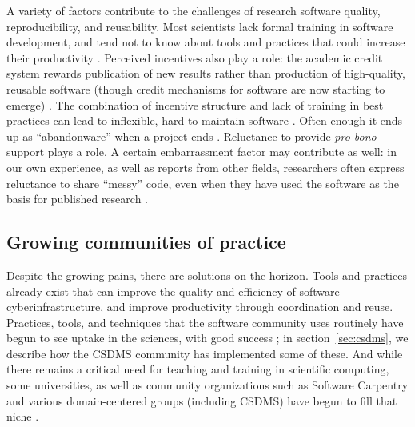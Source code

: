 \documentclass[12pt]{amsart}
\begin{document}
A variety of factors contribute to the challenges of research software quality, reproducibility, and reusability. Most scientists lack formal training in software development, and tend not to know about tools and practices that could increase their productivity \citep{kelly2007software,basili2008understanding,faulk2009scientific,hannay2009scientists,hwang2017software,alnoamany2018towards,pinto2018scientists,kellogg2018role}. Perceived incentives also play a role: the academic credit system rewards publication of new results rather than production of high-quality, reusable software (though credit mechanisms for software are now starting to emerge) \citep{leveque2009python,howison2011scientific,morin2012shining,turk2013scaling,ahalt2014water,poisot2015best,hwang2017software,wiese2019naming}. The combination of incentive structure and lack of training in best practices can lead to inflexible, hard-to-maintain software \citep{brown2014run,johanson2018software}. Often enough it ends up as ``abandonware'' when a project ends \citep{barnes2010publish}. Reluctance to provide \textit{pro bono} support plays a role. A certain embarrassment factor may contribute as well: in our own experience, as well as reports from other fields, researchers often express reluctance to share ``messy'' code, even when they have used the software as the basis for published research \citep{barnes2010publish,morin2012shining,leveque2013top}.



\subsection{Growing communities of practice}

Despite the growing pains, there are solutions on the horizon. Tools and practices already exist that can improve the quality and efficiency of software cyberinfrastructure, and improve productivity through coordination and reuse. Practices, tools, and techniques that the software community uses routinely have begun to see uptake in the sciences, with good success \citep{bangerth2013makes,turk2013scaling,hastings2014ten,wilson2014best,brown2014run,poisot2015best,hwang2017software,nanthaamornphong2017test,scott2017esip,taschuk2017ten,wilson2017good,benureau2018re,bryan2018excuse,adorf2018professionally,lathrop2019introduction}; in section~\ref{sec:csdms}, we describe how the CSDMS community has implemented some of these. And while there remains a critical need for teaching and training in scientific computing, some universities, as well as community organizations such as Software Carpentry and various domain-centered groups (including CSDMS) have begun to fill that niche \citep[e.g.,][]{jacobs2016experiences}. 
\end{document}

